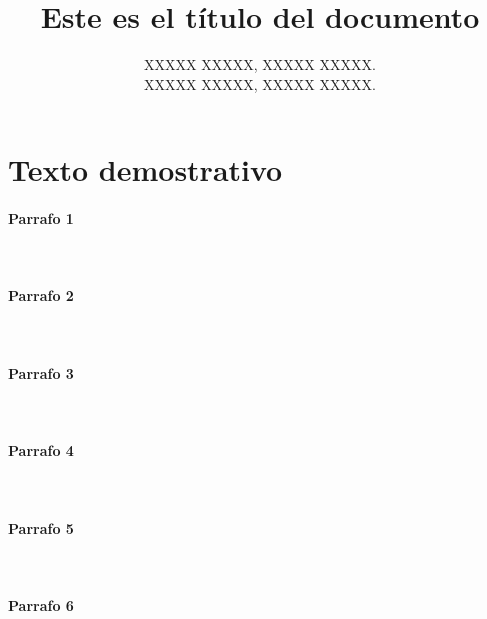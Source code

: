 
%
%

\title{Este es el título del documento}
\author{XXXXX XXXXX, XXXXX XXXXX.  \par XXXXX XXXXX, XXXXX XXXXX.}
\date{\the\year}

\usepackage{lipsum}


    \maketitle
    \tableofcontents
    \newpage

    \section{Texto demostrativo}
    \paragraph{Parrafo 1}
    \lipsum[1]\\
    \paragraph{Parrafo 2}
    \lipsum[2]\\
    \paragraph{Parrafo 3}
    \lipsum[3]\\
    \paragraph{Parrafo 4}
    \lipsum[4]\\
    \paragraph{Parrafo 5}
    \lipsum[5]\\
    \paragraph{Parrafo 6}
    \lipsum[6]\\


